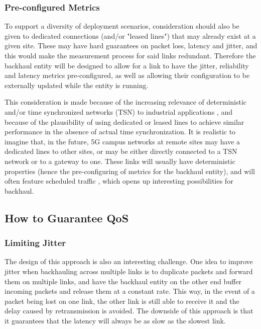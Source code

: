 \subsubsection{Pre-configured Metrics}

To support a diversity of deployment scenarios, consideration should also be given to dedicated connections (and/or "leased lines") that may already exist at a given site. These may have hard guarantees on packet loss, latency and jitter, and this would make the measurement process for said links redundant. Therefore the backhaul entity will be designed to allow for a link to have the jitter, reliability and latency metrics pre-configured, as well as allowing their configuration to be externally updated while the entity is running.

This consideration is made because of the increasing relevance of deterministic and/or time synchronized networks (TSN) to industrial applications \cite{finn2019deterministic, zand2012wireless, tschoke2021time}, and because of the plausibility of using dedicated or leased lines to achieve similar performance \cite{tschoke2021time} in the absence of actual time synchronization. It is realistic to imagine that, in the future, 5G campus networks at remote sites may have a dedicated lines to other sites, or may be either directly connected to a TSN network or to a gateway to one. These links will usually have deterministic properties (hence the pre-configuring of metrics for the backhaul entity), and will often feature scheduled traffic \cite{finn2019deterministicarch}, which opens up interesting possibilities for backhaul.

\subsection{How to Guarantee QoS}

\subsubsection{Limiting Jitter}

The design of this approach is also an interesting challenge. One idea to improve jitter when backhauling across multiple links is to duplicate packets and forward them on multiple links, and have the backhaul entity on the other end buffer incoming packets and release them at a constant rate. This way, in the event of a packet being lost on one link, the other link is still able to receive it and the delay caused by retransmission is avoided. The downside of this approach is that it guarantees that the latency will always be as slow as the slowest link.\

